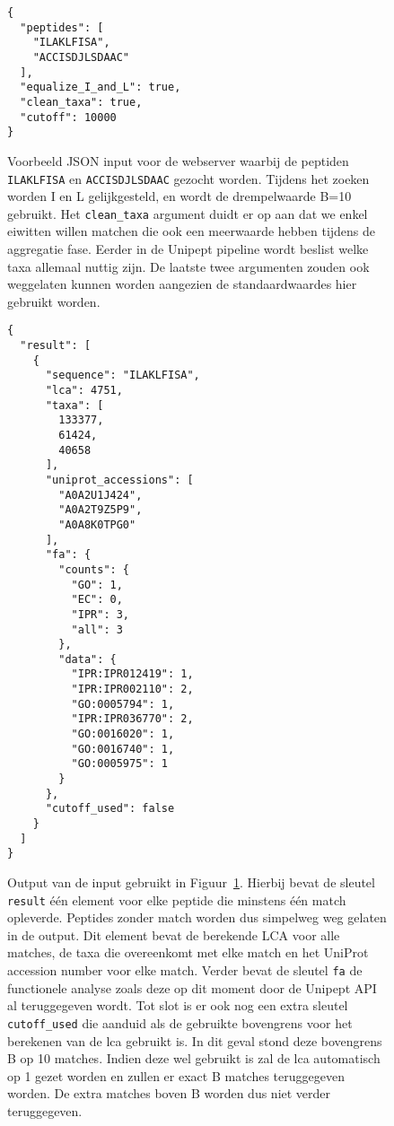 \begin{figure}[h!]
    \begin{verbatim}
{
  "peptides": [
    "ILAKLFISA",
    "ACCISDJLSDAAC"
  ],
  "equalize_I_and_L": true,
  "clean_taxa": true,
  "cutoff": 10000
}
    \end{verbatim}
    \caption{Voorbeeld JSON input voor de webserver waarbij de peptiden \texttt{ILAKLFISA} en \texttt{ACCISDJLSDAAC} gezocht worden.
    Tijdens het zoeken worden I en L gelijkgesteld, en wordt de drempelwaarde B=10 gebruikt.
    Het \texttt{clean\_taxa} argument duidt er op aan dat we enkel eiwitten willen matchen die ook een meerwaarde hebben tijdens de aggregatie fase.
    Eerder in de Unipept pipeline wordt beslist welke taxa allemaal nuttig zijn.
    De laatste twee argumenten zouden ook weggelaten kunnen worden aangezien de standaardwaardes hier gebruikt worden.}
    \label{fig:webserver_json_input}
\end{figure}

\begin{figure}[h!]
    \begin{verbatim}
{
  "result": [
    {
      "sequence": "ILAKLFISA",
      "lca": 4751,
      "taxa": [
        133377,
        61424,
        40658
      ],
      "uniprot_accessions": [
        "A0A2U1J424",
        "A0A2T9Z5P9",
        "A0A8K0TPG0"
      ],
      "fa": {
        "counts": {
          "GO": 1,
          "EC": 0,
          "IPR": 3,
          "all": 3
        },
        "data": {
          "IPR:IPR012419": 1,
          "IPR:IPR002110": 2,
          "GO:0005794": 1,
          "IPR:IPR036770": 2,
          "GO:0016020": 1,
          "GO:0016740": 1,
          "GO:0005975": 1
        }
      },
      "cutoff_used": false
    }
  ]
}
    \end{verbatim}
    \caption{Output van de input gebruikt in Figuur~\ref{fig:webserver_json_input}.
    Hierbij bevat de sleutel \texttt{result} één element voor elke peptide die minstens één match opleverde.
    Peptides zonder match worden dus simpelweg weg gelaten in de output.
    Dit element bevat de berekende LCA voor alle matches, de taxa die overeenkomt met elke match en het UniProt accession number voor elke match.
    Verder bevat de sleutel \texttt{fa} de functionele analyse zoals deze op dit moment door de Unipept API al teruggegeven wordt.
    Tot slot is er ook nog een extra sleutel \texttt{cutoff\_used} die aanduid als de gebruikte bovengrens voor het berekenen van de lca gebruikt is.
    In dit geval stond deze bovengrens B op 10 matches.
    Indien deze wel gebruikt is zal de lca automatisch op 1 gezet worden en zullen er exact B matches teruggegeven worden.
    De extra matches boven B worden dus niet verder teruggegeven.}
    \label{fig:webserver_json_output}
\end{figure}

